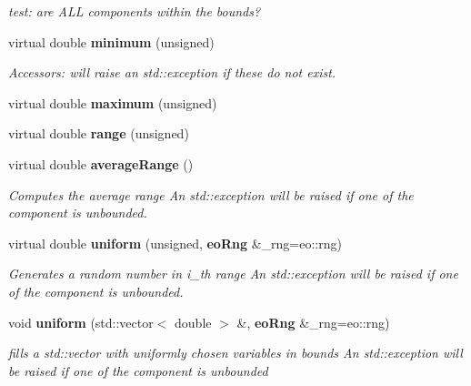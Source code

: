 \begin{CompactItemize}
\begin{CompactList}\small\item\em test: are ALL components within the bounds? \item\end{CompactList}\item 
virtual double {\bf minimum} (unsigned)\label{classeo_real_vector_no_bounds_a14}

\begin{CompactList}\small\item\em Accessors: will raise an std::exception if these do not exist. \item\end{CompactList}\item 
virtual double {\bf maximum} (unsigned)\label{classeo_real_vector_no_bounds_a15}

\item 
virtual double {\bf range} (unsigned)\label{classeo_real_vector_no_bounds_a16}

\item 
virtual double {\bf average\-Range} ()\label{classeo_real_vector_no_bounds_a17}

\begin{CompactList}\small\item\em Computes the average range An std::exception will be raised if one of the component is unbounded. \item\end{CompactList}\item 
virtual double {\bf uniform} (unsigned, {\bf eo\-Rng} \&\_\-rng=eo::rng)\label{classeo_real_vector_no_bounds_a18}

\begin{CompactList}\small\item\em Generates a random number in i\_\-th range An std::exception will be raised if one of the component is unbounded. \item\end{CompactList}\item 
void {\bf uniform} (std::vector$<$ double $>$ \&, {\bf eo\-Rng} \&\_\-rng=eo::rng)\label{classeo_real_vector_no_bounds_a19}

\begin{CompactList}\small\item\em fills a std::vector with uniformly chosen variables in bounds An std::exception will be raised if one of the component is unbounded \item\end{CompactList}\end{CompactItemize}


